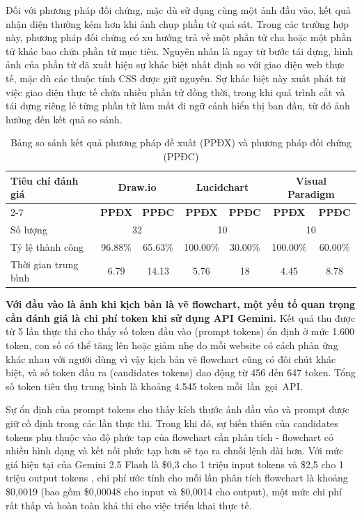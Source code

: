 \documentclass[a4paper, 12pt]{report}
\begin{document}
{Đối với phương pháp đối chứng, mặc dù sử dụng cùng một ảnh đầu vào, kết quả nhận diện thường kém hơn khi ảnh chụp phần tử quá sát. Trong các trường hợp này, phương pháp đối chứng có xu hướng trả về một phần tử cha hoặc một phần tử khác bao chứa phần tử mục tiêu. Nguyên nhân là ngay từ bước tái dựng, hình ảnh của phần tử đã xuất hiện sự khác biệt nhất định so với giao diện web thực tế, mặc dù các thuộc tính CSS được giữ nguyên. Sự khác biệt này xuất phát từ việc giao diện thực tế chứa nhiều phần tử đồng thời, trong khi quá trình cắt và tái dựng riêng lẻ từng phần tử làm mất đi ngữ cảnh hiển thị ban đầu, từ đó ảnh hưởng đến kết quả so sánh.


\begin{table}[H]
\caption{Bảng so sánh kết quả phương pháp đề xuất (PPĐX) và phương pháp đối chứng (PPĐC)}
\label{tab:comparison_render}
\centering
\begin{tabular}{|l|c|c|c|c|c|c|}
\hline
\multirow{2}{*}{\textbf{Tiêu chí đánh giá}} & \multicolumn{2}{c|}{\textbf{Draw.io}} & \multicolumn{2}{c|}{\textbf{Lucidchart}} & \multicolumn{2}{c|}{\textbf{Visual Paradigm}} \\ \cline{2-7}
 & \textbf{PPĐX} & \textbf{PPĐC} & \textbf{PPĐX} & \textbf{PPĐC} & \textbf{PPĐX} & \textbf{PPĐC} \\ \hline
Số lượng & \multicolumn{2}{c|}{32} & \multicolumn{2}{c|}{10} & \multicolumn{2}{c|}{10} \\ \hline
Tỷ lệ thành công & 96.88\% & 65.63\% & 100.00\% & 30.00\% & 100.00\% & 60.00\% \\ \hline
Thời gian trung bình & 6.79 & 14.13 & 5.76 & 18 & 4.45 & 8.78 \\ \hline
\end{tabular}
\end{table}




\textbf{Với đầu vào là ảnh khi kịch bản là vẽ flowchart, một yếu tố quan trọng cần đánh giá là chi phí token khi sử dụng API Gemini.} Kết quả thu được từ 5 lần thực thi cho thấy số token đầu vào (prompt tokens) ổn định ở mức 1.600 token, con số có thể tăng lên hoặc giảm nhẹ do mỗi website có cách phản ứng khác nhau với người dùng vì vậy kịch bản vẽ flowchart cũng có đôi chút khác biệt, và số token đầu ra (candidates tokens) dao động từ 456 đến 647 token. Tổng số token tiêu thụ trung bình là khoảng 4.545 token mỗi~lần~gọi~API. 



Sự ổn định của prompt tokens cho thấy kích thước ảnh đầu vào và prompt được giữ cố định trong các lần thực thi. Trong khi đó, sự biến thiên của candidates tokens phụ thuộc vào độ phức tạp của flowchart cần phân tích - flowchart có nhiều hình dạng và kết nối phức tạp hơn sẽ tạo ra chuỗi lệnh dài hơn. Với mức giá hiện tại của Gemini 2.5 Flash là \$0,3 cho 1 triệu input tokens và \$2,5 cho 1 triệu output tokens \cite{gemini_pricing}, chi phí ước tính cho mỗi lần phân tích flowchart là khoảng \$0,0019 (bao gồm \$0,00048 cho input và \$0,0014 cho output), một mức chi phí rất thấp và hoàn toàn khả thi cho việc triển khai thực tế.



}
\end{document}
